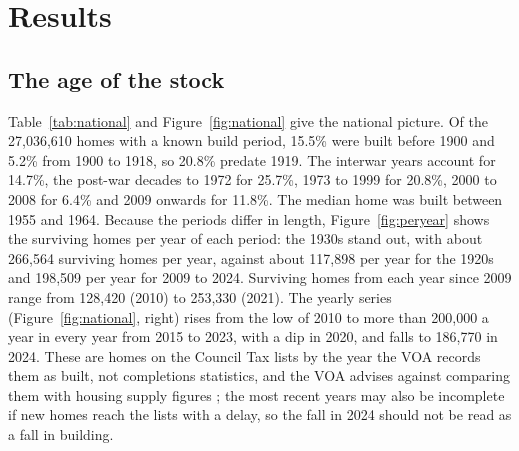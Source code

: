 \documentclass[11pt,a4paper]{article}
\begin{document}
\section{Results}
\label{sec:results}
\subsection{The age of the stock}
Table~\ref{tab:national} and Figure~\ref{fig:national} give the national picture. Of the 27,036,610 homes with a known build period, 15.5\% were built before 1900 and 5.2\% from 1900 to 1918, so 20.8\% predate 1919. The interwar years account for 14.7\%, the post-war decades to 1972 for 25.7\%, 1973 to 1999 for 20.8\%, 2000 to 2008 for 6.4\% and 2009 onwards for 11.8\%. The median home was built between 1955 and 1964. Because the periods differ in length, Figure~\ref{fig:peryear} shows the surviving homes per year of each period: the 1930s stand out, with about 266,564 surviving homes per year, against about 117,898 per year for the 1920s and 198,509 per year for 2009 to 2024. Surviving homes from each year since 2009 range from 128,420 (2010) to 253,330 (2021). The yearly series (Figure~\ref{fig:national}, right) rises from the low of 2010 to more than 200,000 a year in every year from 2015 to 2023, with a dip in 2020, and falls to 186,770 in 2024. These are homes on the Council Tax lists by the year the VOA records them as built, not completions statistics, and the VOA advises against comparing them with housing supply figures \citep{voa2025com}; the most recent years may also be incomplete if new homes reach the lists with a delay, so the fall in 2024 should not be read as a fall in building.
\end{document}
